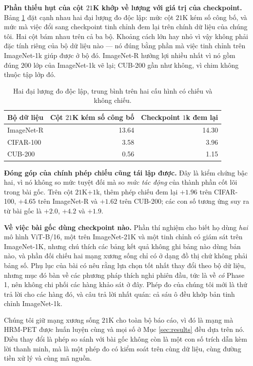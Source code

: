\documentclass[11pt,a4paper]{article}
\begin{document}
\textbf{Phần thiếu hụt của cột $21$K khớp về lượng với giá trị của checkpoint.}
Bảng \ref{tab:backbone-delta} đặt cạnh nhau hai đại lượng đo độc lập: mức cột
$21$K kém số công bố, và mức mà việc đổi sang checkpoint tinh chỉnh đem lại trên
chính dữ liệu của chúng tôi. Hai cột bám nhau trên cả ba bộ. Khoảng cách lớn hay
nhỏ vì vậy không phải đặc tính riêng của bộ dữ liệu nào --- nó đúng bằng phần mà
việc tinh chỉnh trên ImageNet-1k giúp được ở bộ đó. ImageNet-R hưởng lợi nhiều
nhất vì nó gồm đúng $200$ lớp của ImageNet-1k vẽ lại; CUB-200 gần như không, vì
chim không thuộc tập lớp đó.

\begin{table}[htbp]
\centering
\caption{Hai đại lượng đo độc lập, trung bình trên hai cấu hình có chiếu và không
chiếu.}
\label{tab:backbone-delta}
\begin{tabular}{@{}lrr@{}}
\toprule
Bộ dữ liệu & Cột $21$K kém số công bố & Checkpoint $1$k đem lại \\
\midrule
ImageNet-R & 13.64 & 14.30 \\
CIFAR-100  & \ \ 3.58 & \ \ 3.96 \\
CUB-200    & \ \ 0.56 & \ \ 1.15 \\
\bottomrule
\end{tabular}
\end{table}

\textbf{Đóng góp của chính phép chiếu cũng tái lập được.} Đây là kiểm chứng bậc
hai, vì nó không so mức tuyệt đối mà so \emph{mức tác động} của thành phần cốt
lõi trong bài gốc. Trên cột $21$K$+1$k, thêm phép chiếu đem lại $+1.96$ trên
CIFAR-100, $+4.65$ trên ImageNet-R và $+1.62$ trên CUB-200; các con số tương ứng
suy ra từ bài gốc là $+2.0$, $+4.2$ và $+1.9$.

\textbf{Về việc bài gốc dùng checkpoint nào.} Phần thí nghiệm cho biết họ dùng
\emph{hai} mô hình ViT-B/16, một trên ImageNet-21K và một tinh chỉnh có giám sát
trên ImageNet-1K, nhưng chú thích các bảng kết quả không ghi bảng nào dùng bản
nào, và phần đối chiếu hai mạng xương sống chỉ có ở dạng đồ thị chứ không phải
bảng số. Phụ lục của bài có nêu rằng lựa chọn tốt nhất thay đổi theo bộ dữ liệu,
nhưng mục đó bàn về các phương pháp thích nghi phiên đầu, tức là về \emph{có}
Phase 1, nên không chi phối các hàng khảo sát ở đây. Phép đo của chúng tôi mới là
thứ trả lời cho các hàng đó, và câu trả lời nhất quán: cả sáu ô đều khớp bản tinh
chỉnh ImageNet-1k.

Chúng tôi giữ mạng xương sống $21$K cho toàn bộ báo cáo, vì đó là mạng mà HRM-PET
được huấn luyện cùng và mọi số ở Mục \ref{sec:results} đều dựa trên nó. Điều thay
đổi là phép so sánh với bài gốc không còn là một con số trích dẫn kèm lời thanh
minh, mà là một phép đo có kiểm soát trên cùng dữ liệu, cùng đường tiền xử lý và
cùng mã nguồn.
\end{document}
